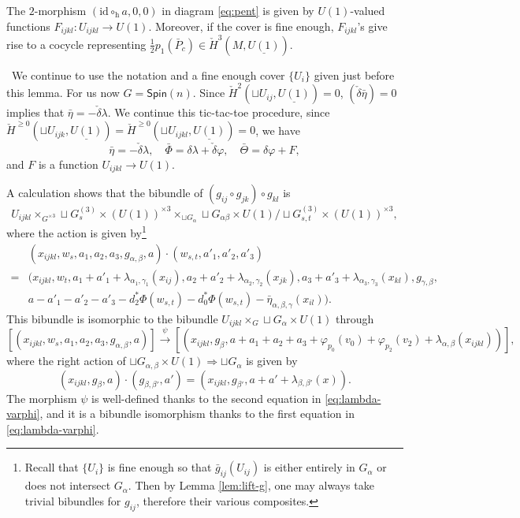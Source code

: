 \documentclass[letterpaper,10pt, oneside]{article} %
\newcommand{\Spin}{\mathsf{Spin}}%
\newcommand{\pf}{\noindent{\bf Proof.}\ }
\newcommand{\half}{\frac{1}{2}}
\newcommand{\h}{\mathrm{h}}
\newcommand{\id}{\mathrm{id}}
\newcommand{\bPhi}{\bar{\Phi}}
\newcommand{\bareta}{\bar{\eta}}
\newcommand{\bTheta}{\bar{\Theta}}
\begin{document}
\begin{lemma}\label{lem:tech}
The $2$-morphism $(\id
\circ_\h a, 0, 0) $ in diagram \eqref{eq:pent} is given by
$U(1)$-valued functions $F_{ijkl}:U_{ijkl}\to U(1)$. Moreover, if the cover is fine enough,
$F_{ijkl}$'s give rise to a cocycle representing $\half p_1(\bar{P}_c) \in
\check{H}^3(M, \underline{U(1)})$.
\end{lemma}
\pf We continue to use the notation and a fine enough cover $\{U_i\}$ given just before this lemma. For us now $G=\Spin(n)$.
Since $\check{H}^2(\sqcup U_{ij}, \underline{U(1)})=0$,
$(\check{\delta} \bareta)=0$ implies that
$\bareta=-\check{\delta}\lambda$.  We continue this tic-tac-toe procedure, since
$\check{H}^{\ge 0}(\sqcup U_{ijk}, \underline{U(1)})=\check{H}^{\ge 0}(\sqcup U_{ijkl}, \underline{U(1)}) =0$,  we have
\begin{equation}\label{eq:lambda-varphi}
\bareta=-\check{\delta}\lambda, \quad \bPhi=\delta \lambda +
\check{\delta} \varphi, \quad \bTheta=\delta \varphi +F,
\end{equation}
and $F$ is a function $U_{ijkl}\to U(1)$.

A calculation shows that the bibundle of $(g_{ij} \circ g_{jk})\circ
g_{kl}$ is $$U_{ijkl}\times_{G^{\times 3}} \sqcup G^{(3)}_s \times
(U(1))^{\times 3} \times_{\sqcup G_{\alpha} } \sqcup G_{\alpha \beta} \times
U(1)/ \sqcup G^{(3)}_{s, t} \times (U(1))^{\times 3}, $$
 where the action is
given by\footnote{Recall that  $\{U_i
  \}$ is fine enough so that $\bar{g}_{ij}(U_{ij})$ is either entirely in $G_\alpha$
  or does not intersect $G_\alpha$. Then by Lemma
  \ref{lem:lift-g}, one may always take trivial
  bibundles for $g_{ij}$, therefore their various composites.}
\[
\begin{split}
& (x_{ijkl}, w_s, a_1, a_2, a_3, g_{\alpha,\beta}, a) \cdot (w_{s, t},
a'_1, a'_2, a'_3)  \\
=& (x_{ijkl}, w_t, a_1+a'_1 + \lambda_{\alpha_1,\gamma_1}(x_{ij}),
a_2+a'_2+\lambda_{\alpha_2,\gamma_2}(x_{jk}),
a_3+a'_3+\lambda_{\alpha_3,\gamma_3}(x_{kl}), g_{\gamma,\beta}, \\
&a-a'_1-a'_2-a'_3-d_2^*\Phi(w_{s,t})-d^*_0\Phi(w_{s,t})-\bareta_{\alpha,\beta,\gamma}(x_{il})
).
\end{split}
\] This bibundle is isomorphic to the bibundle $U_{ijkl}\times_{G} \sqcup G_\alpha
\times U(1)$ through
\[
[(x_{ijkl}, w_s, a_1, a_2, a_3, g_{\alpha,\beta}, a)] \xrightarrow{\psi}
[(x_{ijkl}, g_\beta,
a+a_1+a_2+a_3+\varphi_{p_0}(v_0)+\varphi_{p_2}(v_2)+\lambda_{\alpha,\beta}(x_{ijkl}) )],
\]
where the right action of $\sqcup G_{\alpha,\beta}\times U(1)
\Rightarrow \sqcup G_{\alpha}$ is given by $$(x_{ijkl}, g_\beta,
a)\cdot (g_{\beta,\beta'}, a' )=(x_{ijkl}, g_{\beta'},
a+a'+\lambda_{\beta,\beta'}(x)).$$ The morphism $\psi$ is well-defined
thanks to the second equation in \eqref{eq:lambda-varphi}, and it is a
bibundle isomorphism thanks to the first equation in
\eqref{eq:lambda-varphi}.
\end{document}
